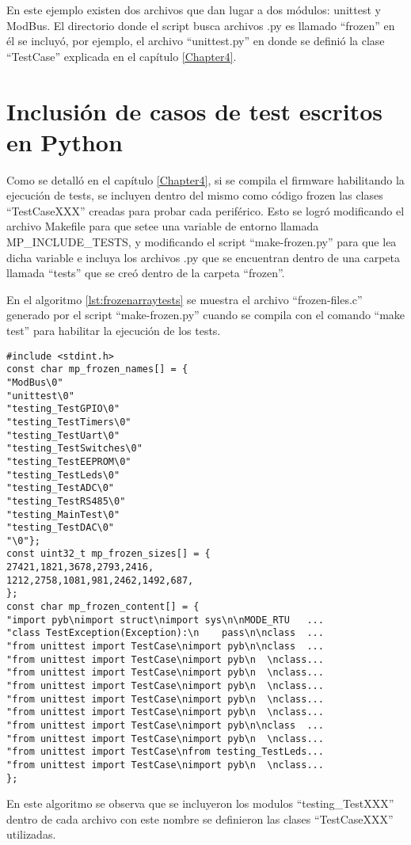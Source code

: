 En este ejemplo existen dos archivos que dan lugar a dos módulos: unittest y ModBus.
El directorio donde el script busca archivos .py es llamado “frozen” en él se incluyó, por ejemplo, el archivo “unittest.py” en donde se definió la clase “TestCase” explicada en el capítulo \ref{Chapter4}.

\section{Inclusión de casos de test escritos en Python}

Como se detalló en el capítulo \ref{Chapter4}, si se compila el firmware habilitando la ejecución de tests, se incluyen dentro del mismo como código frozen las clases “TestCaseXXX” creadas para probar cada periférico. Esto se logró modificando el archivo Makefile para que setee una variable de entorno llamada MP\_INCLUDE\_TESTS, y modificando el script “make-frozen.py” para que lea dicha variable e incluya los archivos .py que se encuentran dentro de una carpeta llamada “tests” que se creó dentro de la carpeta “frozen”. 

En el algoritmo \ref{lst:frozenarraytests} se muestra el archivo “frozen-files.c” generado por el script “make-frozen.py” cuando se compila con el comando “make test” para habilitar la ejecución de los tests.

\begin{lstlisting}[label={lst:frozenarraytests},caption=Archivo frozen-files.c incluyendo clases de test.] 
#include <stdint.h>
const char mp_frozen_names[] = {
"ModBus\0"
"unittest\0"
"testing_TestGPIO\0"
"testing_TestTimers\0"
"testing_TestUart\0"
"testing_TestSwitches\0"
"testing_TestEEPROM\0"
"testing_TestLeds\0"
"testing_TestADC\0"
"testing_TestRS485\0"
"testing_MainTest\0"
"testing_TestDAC\0"
"\0"};
const uint32_t mp_frozen_sizes[] = {
27421,1821,3678,2793,2416,
1212,2758,1081,981,2462,1492,687,
};
const char mp_frozen_content[] = {
"import pyb\nimport struct\nimport sys\n\nMODE_RTU   ... 
"class TestException(Exception):\n    pass\n\nclass  ...
"from unittest import TestCase\nimport pyb\n\nclass  ...
"from unittest import TestCase\nimport pyb\n  \nclass... 
"from unittest import TestCase\nimport pyb\n  \nclass...
"from unittest import TestCase\nimport pyb\n  \nclass... 
"from unittest import TestCase\nimport pyb\n  \nclass... 
"from unittest import TestCase\nimport pyb\n  \nclass... 
"from unittest import TestCase\nimport pyb\n\nclass  ...
"from unittest import TestCase\nimport pyb\n  \nclass... 
"from unittest import TestCase\nfrom testing_TestLeds... 
"from unittest import TestCase\nimport pyb\n  \nclass... 
};
\end{lstlisting}

En este algoritmo se observa que se incluyeron los modulos “testing\_TestXXX” dentro de cada archivo con este nombre se definieron las clases “TestCaseXXX” utilizadas.
